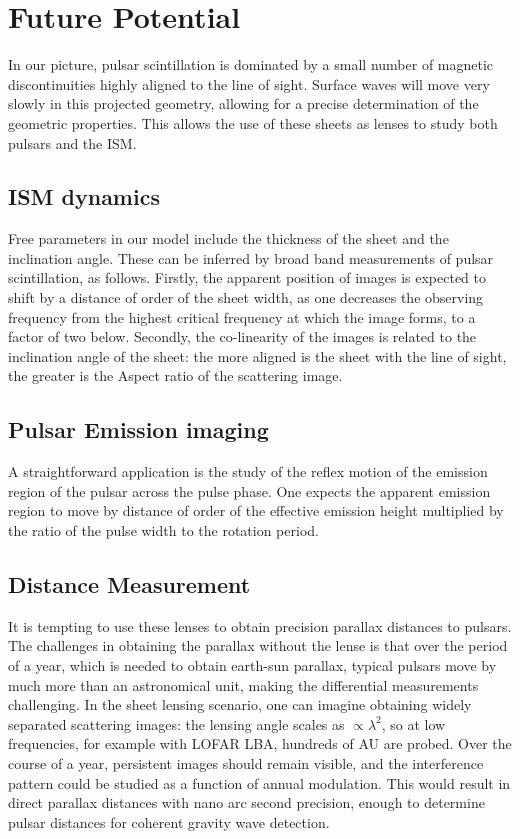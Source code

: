 \documentclass[useAMS,usenatbib]{mn2e}
\begin{document}
\section{Future Potential}

In our picture, pulsar scintillation is dominated by a small number of
magnetic discontinuities highly aligned to the line of sight.  Surface
waves will move very slowly in this projected geometry, allowing for a
precise determination of the geometric properties.  This allows the
use of these sheets as lenses to study both pulsars and the ISM.  

\subsection{ISM dynamics}

Free parameters in our model include the thickness of the sheet and the
inclination angle.  These can be inferred by broad band measurements
of pulsar scintillation, as follows. Firstly, the apparent position of images is expected to shift by
a distance of order of the sheet width, as one decreases the observing frequency from the
highest critical frequency at which the image forms, to a factor of
two below.  Secondly, the co-linearity of the images is related to
the inclination angle of the sheet: the more aligned is the sheet with the line of
sight, the greater is the Aspect ratio of the scattering image.

\subsection{Pulsar Emission imaging}

A straightforward application is the study of the reflex motion of the
emission region of the pulsar across the pulse phase.  One expects the
apparent emission region to move by distance of order of the effective emission height
multiplied by the ratio of the pulse width to the rotation period.

\subsection{Distance Measurement}

It is tempting to use these lenses to obtain precision parallax
distances to pulsars.  The challenges in obtaining the parallax without the lense
 is that over the
period of a year, which is needed to obtain earth-sun parallax,
typical pulsars move by much more than an astronomical unit, making
the differential measurements challenging.  In the sheet lensing
scenario, one can imagine obtaining widely separated scattering images:
the lensing angle scales as $\propto \lambda^2$, so at low
frequencies, for example with LOFAR LBA, hundreds of AU are probed.
Over the course of a year, persistent images should remain visible, and the
interference pattern could be studied as a function of annual
modulation.  This would result in direct parallax distances with nano arc
second precision, enough to determine pulsar distances for coherent
gravity wave detection.
\end{document}
